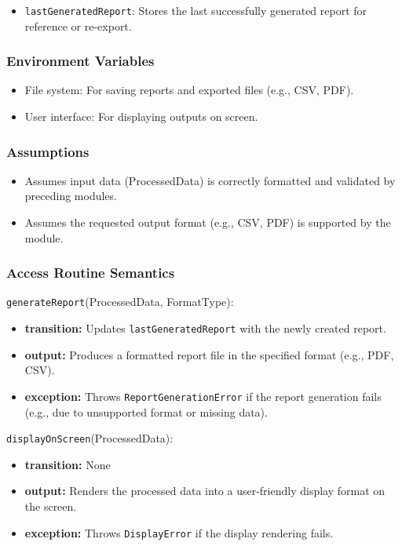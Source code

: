 \documentclass[12pt, titlepage]{article}
\begin{document}
\begin{itemize}
    \item \texttt{lastGeneratedReport}: Stores the last successfully generated report for reference or re-export.
\end{itemize}

\subsubsection{Environment Variables}

\begin{itemize}
    \item File system: For saving reports and exported files (e.g., CSV, PDF).
    \item User interface: For displaying outputs on screen.
\end{itemize}

\subsubsection{Assumptions}

\begin{itemize}
    \item Assumes input data (ProcessedData) is correctly formatted and validated by preceding modules.
    \item Assumes the requested output format (e.g., CSV, PDF) is supported by the module.
\end{itemize}

\subsubsection{Access Routine Semantics}

\noindent \texttt{generateReport}(ProcessedData, FormatType):
\begin{itemize}
    \item \textbf{transition:} Updates \texttt{lastGeneratedReport} with the newly created report.
    \item \textbf{output:} Produces a formatted report file in the specified format (e.g., PDF, CSV).
    \item \textbf{exception:} Throws \texttt{ReportGenerationError} if the report generation fails (e.g., due to unsupported format or missing data).
\end{itemize}

\noindent \texttt{displayOnScreen}(ProcessedData):
\begin{itemize}
    \item \textbf{transition:} None
    \item \textbf{output:} Renders the processed data into a user-friendly display format on the screen.
    \item \textbf{exception:} Throws \texttt{DisplayError} if the display rendering fails.
\end{itemize}
\end{document}
